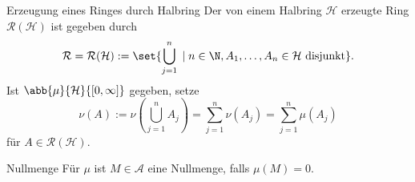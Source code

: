 \begin{karte}{Erzeugung eines Ringes durch Halbring}
	Der von einem Halbring \( \mathcal{H} \) erzeugte Ring \( \mathcal{R}(\mathcal{H}) \) ist gegeben durch 
	\[ \mathcal{R} = \mathcal{R}(\mathcal{H}) := \set{ \bigcup_{j=1}^n \;|\; n\in\N, A_1, \ldots, A_n \in \mathcal{H} \text{ disjunkt} }. \]
	Ist \( \abb{\mu}{\mathcal{H}}{[0,\infty]} \) gegeben, setze 
	\[ \nu(A) := \nu\left(\bigcup_{j=1}^n A_j \right) = \sum_{j=1}^n \nu(A_j) = \sum_{j=1}^n \mu(A_j) \]
	für \( A\in \mathcal{R}(\mathcal{H}) \). 
\end{karte}

\begin{karte}{Nullmenge}
	Für \(\mu\) ist \( M\in \mathcal{A} \) eine Nullmenge, falls \( \mu(M) = 0 \).
\end{karte}